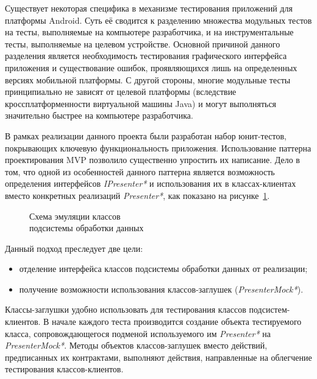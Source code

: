 Существует некоторая специфика в механизме тестирования приложений
для платформы Android. Суть её сводится к разделению множества модульных тестов
на тесты, выполняемые на компьютере разработчика, и на инструментальные тесты,
выполняемые на целевом устройстве.
Основной причиной данного разделения является необходимость тестирования
графического интерфейса приложения и существование ошибок,
проявляющихся лишь на определенных версиях мобильной платформы.
С другой стороны, многие модульные тесты принципиально не зависят от
целевой платформы (вследствие кроссплатформенности виртуальной машины Java)
и могут выполняться значительно быстрее на компьютере разработчика.

В рамках реализации данного проекта были разработан набор юнит-тестов,
покрывающих ключевую функциональность приложения.
Использование паттерна проектирования MVP позволило существенно упростить их написание.
Дело в том, что одной из особенностей данного паттерна является возможность
определения интерфейсов \textit{IPresenter*} и использования
их в классах-клиентах вместо конкретных реализаций \textit{Presenter*},
как показано на рисунке~\ref{fig:implementation_testing_presenter}.

\begin{figure}[h!]
  \centering
  \caption{Схема эмуляции классов \\ подсистемы обработки данных}
  \label{fig:implementation_testing_presenter}
\end{figure}

Данный подход преследует две цели:
\begin{itemize}
\item отделение интерфейса классов подсистемы обработки данных от реализации;
\item получение возможности использования классов-заглушек (\textit{PresenterMock*}).
\end{itemize}

Классы-заглушки удобно использовать для тестирования классов подсистем-клиентов.
В начале каждого теста производится создание объекта тестируемого класса,
сопровождающегося подменой используемого им \textit{Presenter*}
на \textit{PresenterMock*}.
Методы объектов классов-заглушек вместо действий, предписанных их контрактами,
выполняют действия, направленные на облегчение тестирования классов-клиентов.

